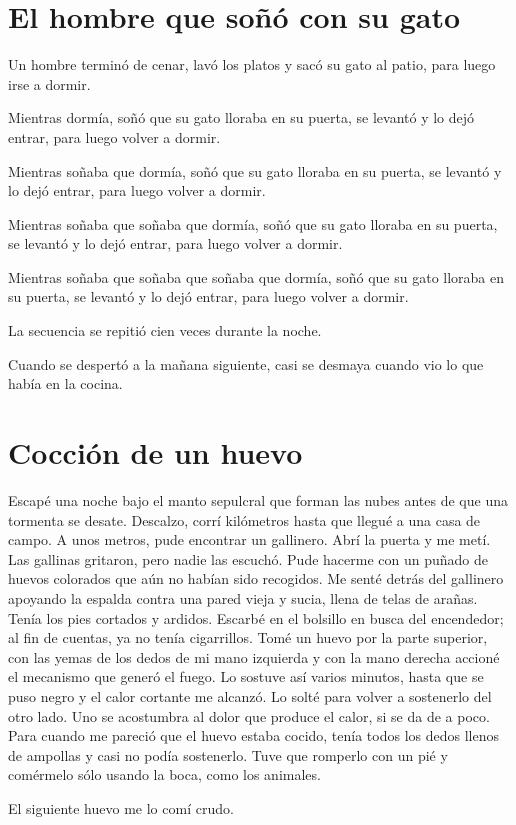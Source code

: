 \documentclass[11pt,twoside,openright,a6paper]{book}
\begin{document}
\chapter*{El hombre que soñó con su gato}

Un hombre terminó de cenar, lavó los platos y sacó su gato al patio, para luego irse a dormir.

Mientras dormía, soñó que su gato lloraba en su puerta, se levantó y lo dejó entrar, para luego volver a dormir.

Mientras soñaba que dormía, soñó que su gato lloraba en su puerta, se levantó y lo dejó entrar, para luego volver a dormir.

Mientras soñaba que soñaba que dormía, soñó que su gato lloraba en su puerta, se levantó y lo dejó entrar, para luego volver a dormir.

Mientras soñaba que soñaba que soñaba que dormía, soñó que su gato lloraba en su puerta, se levantó y lo dejó entrar, para luego volver a dormir.

La secuencia se repitió cien veces durante la noche.

Cuando se despertó a la mañana siguiente, casi se desmaya cuando vio lo que había en la cocina.

\chapter*{Cocción de un huevo}

Escapé una noche bajo el manto sepulcral que forman las nubes antes de que una tormenta se desate. Descalzo, corrí kilómetros hasta que llegué a una casa de campo. A unos metros, pude encontrar un gallinero. Abrí la puerta y me metí. Las gallinas gritaron, pero nadie las escuchó. Pude hacerme con un puñado de huevos colo\-rados que aún no habían sido recogidos. Me senté detrás del gallinero apoyando la espalda contra una pared vieja y sucia, llena de telas de ara\-ñas. Tenía los pies cortados y ardidos. Escarbé en el bolsillo en busca del encendedor; al fin de cuentas, ya no tenía cigarrillos. Tomé un huevo por la parte superior, con las yemas de los dedos de mi mano izquierda y con la mano derecha accioné el mecanismo que generó el fuego. Lo sostuve así varios minutos, hasta que se puso negro y el calor cortante me alcanzó. Lo solté para volver a sostenerlo del otro lado. Uno se acostumbra al dolor que produce el calor, si se da de a poco. Para cuando me pareció que el huevo estaba cocido, tenía todos los dedos llenos de ampollas y casi no podía sostenerlo. Tuve que romperlo con un pié y comérmelo sólo usando la boca, como los animales.

El siguiente huevo me lo comí crudo.
\end{document}
